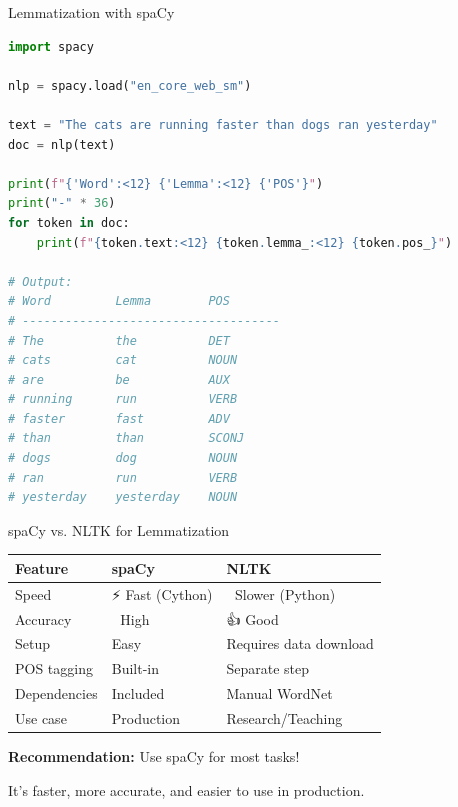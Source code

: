 \documentclass[aspectratio=169]{beamer}
\begin{document}
\begin{frame}[fragile]{Lemmatization with spaCy 🚀}
    \begin{lstlisting}[language=Python]
import spacy

nlp = spacy.load("en_core_web_sm")

text = "The cats are running faster than dogs ran yesterday"
doc = nlp(text)

print(f"{'Word':<12} {'Lemma':<12} {'POS'}")
print("-" * 36)
for token in doc:
    print(f"{token.text:<12} {token.lemma_:<12} {token.pos_}")

# Output:
# Word         Lemma        POS
# ------------------------------------
# The          the          DET
# cats         cat          NOUN
# are          be           AUX
# running      run          VERB
# faster       fast         ADV
# than         than         SCONJ
# dogs         dog          NOUN
# ran          run          VERB
# yesterday    yesterday    NOUN
    \end{lstlisting}
\end{frame}

\begin{frame}{spaCy vs. NLTK for Lemmatization 🥊}
    \begin{table}
        \centering
        \begin{tabular}{lll}
            \toprule
            \textbf{Feature} & \textbf{spaCy} & \textbf{NLTK} \\
            \midrule
            Speed & ⚡ Fast (Cython) & 🐢 Slower (Python) \\
            Accuracy & 🎯 High & 👍 Good \\
            Setup & Easy & Requires data download \\
            POS tagging & Built-in & Separate step \\
            Dependencies & Included & Manual WordNet \\
            Use case & Production & Research/Teaching \\
            \bottomrule
        \end{tabular}
    \end{table}

    \vspace{1em}
    \textbf{Recommendation:} Use spaCy for most tasks!

    It's faster, more accurate, and easier to use in production.
\end{frame}
\end{document}
